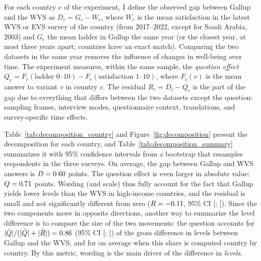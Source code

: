 \documentclass[12pt]{article}
\begin{document}
For each country $c$ of the experiment, I define the observed gap between Gallup and the WVS as $D_c = G_c - W_c$, where $W_c$ is the mean satisfaction in the latest WVS or EVS survey of the country (from 2017--2022, except for Saudi Arabia, 2003) and $G_c$ the mean ladder in Gallup the same year (or the closest year, at most three years apart; \nSameYear countries have an exact match). Comparing the two datasets in the same year removes the influence of changes in well-being over time. The experiment measures, within the same sample, the \textit{question effect} $Q_c = F_c(\text{ladder 0--10}) - F_c(\text{satisfaction 1--10})$, where $F_c(v)$ is the mean answer to variant $v$ in country $c$. %
The residual $R_c = D_c - Q_c$ is the part of the gap due to everything that differs between the two datasets except the question: sampling frames, interview modes, questionnaire context, translations, and survey-specific time effects. %

Table~\ref{tab:decomposition_country} and Figure~\ref{fig:decomposition} present the decomposition for each country, and Table~\ref{tab:decomposition_summary} summarizes it with 95\% confidence intervals from a bootstrap that resamples respondents in the three surveys. On average, the gap between Gallup and WVS answers is $D = 0.60$ points. The question effect is even larger in absolute value: $Q = 0.71$ points. Wording (and scale) thus fully account for the fact that Gallup yields lower levels than the WVS in high-income countries, and the residual is small and not significantly different from zero ($R = -0.11$, 95\% CI [\decompLowMeanResidual; \decompHighMeanResidual]). Since the two components move in opposite directions, another way to summarize the level difference is to compare the size of the two movements: the question accounts for $|\bar Q|/(|\bar Q|+|\bar R|) = 0.86$ (95\% CI [\decompLowShareAbsQuestion; \decompHighShareAbsQuestion]) of the gross difference in levels between Gallup and the WVS, and for \decompShareAbsQuestionCountry on average when this share is computed country by country. By this metric, wording is the main driver of the difference in \textit{levels}.
\end{document}
